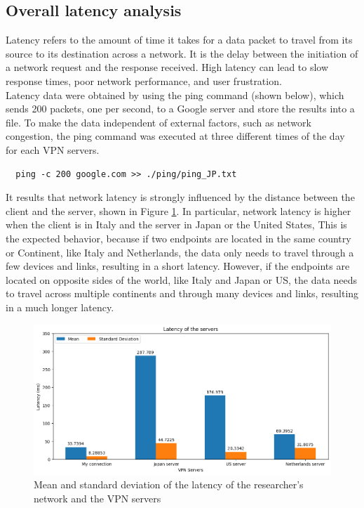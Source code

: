 \documentclass[eng]{class}
\begin{document}
\subsection{Overall latency analysis}
Latency refers to the amount of time it takes for a data packet to travel from its source to its destination across a network.
It is the delay between the initiation of a network request and the response received.
High latency can lead to slow response times, poor network performance, and user frustration.
\\Latency data were obtained by using the ping command (shown below), which sends 200 packets, one per second, to a Google server and store the results into a file.
To make the data independent of external factors, such as network congestion, the ping command was executed at three different times of the day for each VPN servers.
\begin{lstlisting}
  ping -c 200 google.com >> ./ping/ping_JP.txt
\end{lstlisting}
\noindent
It results that network latency is strongly influenced by the distance between the client and the server, shown in Figure \ref*{fig-1}.
In particular, network latency is higher when the client is in Italy and the server in Japan or the United States,
This is the expected behavior, because if two endpoints are located in the same country or Continent, like Italy and Netherlands, the data only needs to travel through a few devices and links, resulting in a short latency.
However, if the endpoints are located on opposite sides of the world, like Italy and Japan or US, the data needs to travel across multiple continents and through many devices and links,
resulting in a much longer latency.
\begin{figure}[H]
    \centering
    \includegraphics[width=.7\columnwidth]{images/ServerLatency.png}
    \caption{Mean and standard deviation of the latency of the researcher's network and the VPN servers}
    \label{fig-1}
\end{figure}
\end{document}
